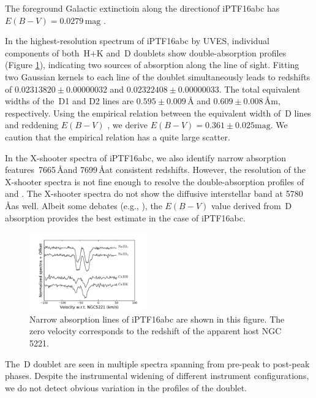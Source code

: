 \documentclass[twocolumn]{aastex61}
\begin{document}
The foreground Galactic extinctioin along the directionof iPTF16abc
has $E(B-V)=0.0279\,\textrm{mag}$ \citep{2011ApJ...737..103S}.

In the highest-resolution spectrum of iPTF16abc by UVES, individual
components of both \,H$+$K and \,D doublets show
double-absorption profiles (Figure \ref{fig:narrow_features}),
indicating two sources of absorption along the line of sight. Fitting
two Gaussian kernels to each line of the  doublet
simultaneously leads to redshifts of $0.02313820\pm0.00000032$ and
$0.02322408\pm0.00000033$. The total equivalent widths of the
\,D1 and D2 lines are $0.595\pm0.009\,\textrm{\AA}$ and
$0.609\pm0.008\,\textrm{\AA}$m, respectively. Using the empirical
relation between the equivalent width of \,D lines and
reddening $E(B-V)$ \citep{2012MNRAS.426.1465P}, we derive
$E(B-V)=0.361\pm0.025\textrm{mag}$. We caution that the empirical
relation has a quite large scatter.

In the X-shooter spectra of iPTF16abc, we also identify narrow
absorption features \,7665\,\AA and 7699\,\AA at consistent
redshifts. However, the resolution of the X-shooter spectra is not
fine enough to resolve the double-absorption profiles of 
and . The X-shooter spectra do not show the diffusive
interstellar band at 5780\,\AA as well.  Albeit some debates (e.g.,
\citealt{2013ApJ...779...38P}), the $E(B-V)$ value derived from
\,D absorption provides the best estimate in the case of
iPTF16abc.

\begin{figure}[htb]
  \centering
  \includegraphics[width=0.45\textwidth]{narrow_abs_features.pdf}
  \caption{Narrow absorption lines of iPTF16abc are shown in this
    figure. The zero velocity corresponds to the redshift of the
    apparent host NGC\,5221.}
  \label{fig:narrow_features}
\end{figure}

The \,D doublet are seen in multiple spectra spanning
from pre-peak to post-peak phases. Despite the instrumental widening of
different instrument configurations, we do not detect obvious variation
in the profiles of the doublet.
\end{document}
